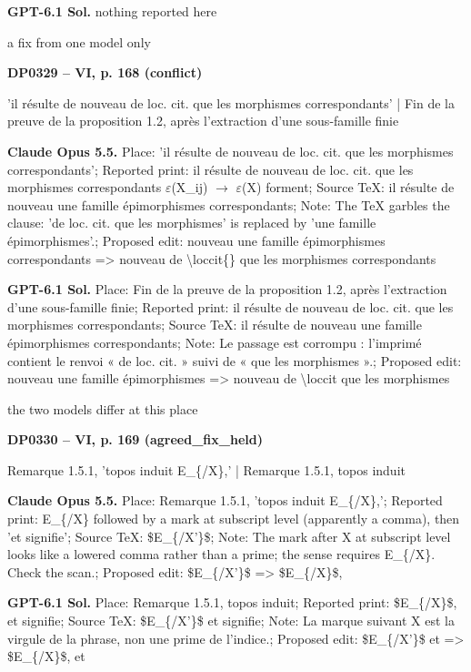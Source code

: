 \textbf{GPT-6.1 Sol.} nothing reported here\par
a fix from one model only\par
\par\noindent\hypertarget{DP0329}{}\textbf{DP0329 -- VI, p. 168 (conflict)}\par
'il résulte de nouveau de loc. cit. que les morphismes correspondants' | Fin de la preuve de la proposition 1.2, après l'extraction d'une sous-famille finie\par
\textbf{Claude Opus 5.5.} Place: 'il résulte de nouveau de loc. cit. que les morphismes correspondants'; Reported print: il résulte de nouveau de loc. cit. que les morphismes correspondants \ensuremath{\varepsilon}(X\_ij) \ensuremath{\to} \ensuremath{\varepsilon}(X) forment; Source TeX: il résulte de nouveau une famille épimorphismes correspondants; Note: The TeX garbles the clause: 'de loc. cit. que les morphismes' is replaced by 'une famille épimorphismes'.; Proposed edit: nouveau une famille épimorphismes correspondants =\allowbreak > nouveau de \textbackslash{}loccit\{\} que les morphismes correspondants\par
\textbf{GPT-6.1 Sol.} Place: Fin de la preuve de la proposition 1.2, après l'extraction d'une sous-famille finie; Reported print: il résulte de nouveau de loc. cit. que les morphismes correspondants; Source TeX: il résulte de nouveau une famille épimorphismes correspondants; Note: Le passage est corrompu : l'imprimé contient le renvoi « de loc. cit. » suivi de « que les morphismes ».; Proposed edit: nouveau une famille épimorphismes =\allowbreak > nouveau de \textbackslash{}loccit que les morphismes\par
the two models differ at this place\par
\par\noindent\hypertarget{DP0330}{}\textbf{DP0330 -- VI, p. 169 (agreed\_fix\_held)}\par
Remarque 1.5.1, 'topos induit E\_\{/X\},' | Remarque 1.5.1, topos induit\par
\textbf{Claude Opus 5.5.} Place: Remarque 1.5.1, 'topos induit E\_\{/X\},'; Reported print: E\_\{/X\} followed by a mark at subscript level (apparently a comma), then 'et signifie'; Source TeX: \$E\_\{/X'\}\$; Note: The mark after X at subscript level looks like a lowered comma rather than a prime; the sense requires E\_\{/X\}. Check the scan.; Proposed edit: \$E\_\{/X'\}\$ =\allowbreak > \$E\_\{/X\}\$,\par
\textbf{GPT-6.1 Sol.} Place: Remarque 1.5.1, topos induit; Reported print: \$E\_\{/X\}\$, et signifie; Source TeX: \$E\_\{/X'\}\$ et signifie; Note: La marque suivant X est la virgule de la phrase, non une prime de l'indice.; Proposed edit: \$E\_\{/X'\}\$ et =\allowbreak > \$E\_\{/X\}\$, et\par
